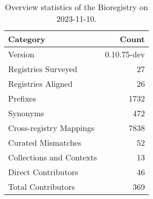 \begin{table}
\caption{Overview statistics of the Bioregistry on 2023-11-10.}
\label{tab:bioregistry-summary}
\begin{tabular}{lr}
\toprule
Category & Count \\
\midrule
Version & 0.10.75-dev \\
Registries Surveyed & 27 \\
Registries Aligned & 26 \\
Prefixes & 1732 \\
Synonyms & 472 \\
Cross-registry Mappings & 7838 \\
Curated Mismatches & 52 \\
Collections and Contexts & 13 \\
Direct Contributors & 46 \\
Total Contributors & 369 \\
\bottomrule
\end{tabular}
\end{table}

